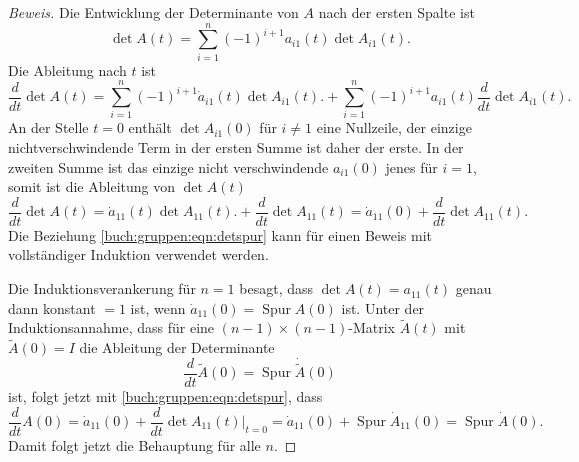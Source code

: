 \begin{proof}[Beweis]
Die Entwicklung der Determinante von $A$ nach der ersten Spalte ist
\[
\det A(t) = \sum_{i=1}^n (-1)^{i+1} a_{i1}(t) \det A_{i1}(t).
\]
Die Ableitung nach $t$ ist
\[
\frac{d}{dt} \det A(t)
=
\sum_{i=1}^n (-1)^{i+1} \dot{a}_{i1}(t) \det A_{i1}(t).
+
\sum_{i=1}^n (-1)^{i+1} a_{i1}(t) \frac{d}{dt}\det A_{i1}(t).
\]
An der Stelle $t=0$ enthält $\det A_{i1}(0)$ für $i\ne 1$
eine Nullzeile, der einzige nichtverschwindende Term in der ersten
Summe ist daher der erste.
In der zweiten Summe ist das einzige nicht verschwindende $a_{i1}(0)$
jenes für $i=1$, somit ist die Ableitung von $\det A(t)$
\begin{equation}
\frac{d}{dt} \det A(t)
=
\dot{a}_{11}(t) \det A_{11}(t).
+
\frac{d}{dt}\det A_{11}(t)
=
\dot{a}_{11}(0) 
+
\frac{d}{dt}\det A_{11}(t).
\label{buch:gruppen:eqn:detspur}
\end{equation}
Die Beziehung \eqref{buch:gruppen:eqn:detspur} kann für einen Beweis mit
vollständiger Induktion verwendet werden.

Die Induktionsverankerung für $n=1$ besagt, dass $\det A(t)=a_{11}(t)$
genau dann konstant $=1$ ist, wenn $\dot{a}_{11}(0)=\operatorname{Spur}A(0)$
ist.
Unter der Induktionsannahme, dass für eine $(n-1)\times(n-1)$-Matrix
$\tilde{A}(t)$ mit $\tilde{A}(0)=I$ die Ableitung der Determinante
\[
\frac{d}{dt}\tilde{A}(0)
=
\operatorname{Spur}\dot{\tilde{A}}(0)
\]
ist, folgt jetzt mit
\eqref{buch:gruppen:eqn:detspur}, dass
\[
\frac{d}{dt}A(0)
=
\dot{a}_{11}(0)
+
\frac{d}{dt} \det A_{11}(t)\bigg|_{t=0}
=
\dot{a}_{11}(0)
+
\operatorname{Spur}\dot{A}_{11}(0)
=
\operatorname{Spur}\dot{A}(0).
\]
Damit folgt jetzt die Behauptung für alle $n$.
\end{proof}

